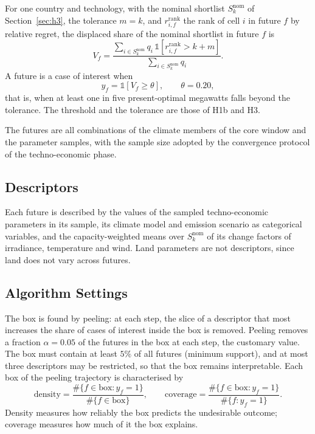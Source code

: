 For one country and technology, with the nominal shortlist
$S^{\mathrm{nom}}_k$ of Section~\ref{sec:h3}, the tolerance $m=k$, and
$r_{i,f}^{\mathrm{rank}}$ the rank of cell $i$ in future $f$ by relative regret,
the displaced share of the nominal shortlist in future $f$ is
\begin{equation}
    V_f=\frac{\sum_{i\in S^{\mathrm{nom}}_k}q_i\,
    \mathbb{1}\!\left[r^{\mathrm{rank}}_{i,f}>k+m\right]}
    {\sum_{i\in S^{\mathrm{nom}}_k}q_i}.
    \label{eq:prim_outcome}
\end{equation}
A future is a case of interest when
\begin{equation}
    y_f=\mathbb{1}\!\left[V_f\geq\theta\right],\qquad\theta=0.20,
    \label{eq:prim_case}
\end{equation}
that is, when at least one in five present-optimal megawatts falls beyond the
tolerance. The threshold and the tolerance are those of H1b and H3.

The futures are all combinations of the climate members of the core window and
the parameter samples, with the sample size adopted by the convergence protocol
of the techno-economic phase.

\subsection{Descriptors}
\label{subsec:prim_descriptors}

Each future is described by the values of the sampled techno-economic parameters
in its sample, its climate model and emission scenario as categorical variables,
and the capacity-weighted means over $S^{\mathrm{nom}}_k$ of its change factors
of irradiance, temperature and wind. Land parameters are not descriptors, since
land does not vary across futures.

\subsection{Algorithm Settings}
\label{subsec:prim_settings}

The box is found by peeling: at each step, the slice of a descriptor that most
increases the share of cases of interest inside the box is removed. Peeling
removes a fraction $\alpha=0.05$ of the futures in the box at each step, the
customary value. The box must contain at least $5\%$ of all futures (minimum
support), and at most three descriptors may be restricted, so that the box
remains interpretable. Each box of the peeling trajectory is characterised by
\begin{equation}
    \mathrm{density}=\frac{\#\{f\in\mathrm{box}:y_f=1\}}{\#\{f\in\mathrm{box}\}},
    \qquad
    \mathrm{coverage}=\frac{\#\{f\in\mathrm{box}:y_f=1\}}{\#\{f:y_f=1\}}.
    \label{eq:prim_density_coverage}
\end{equation}
Density measures how reliably the box predicts the undesirable outcome; coverage
measures how much of it the box explains.

